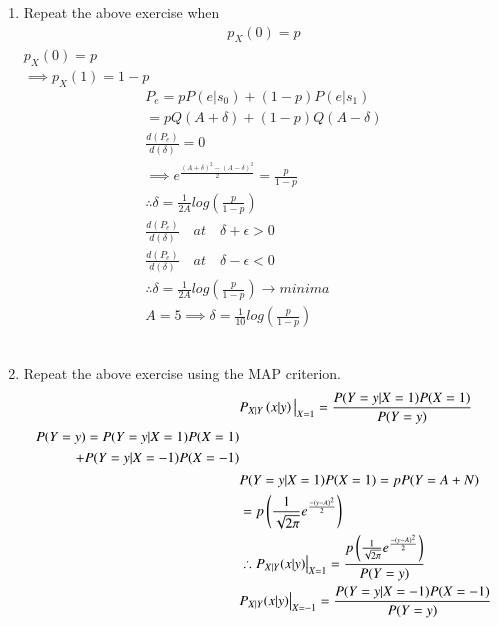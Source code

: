 \documentclass[journal,12pt,twocolumn]{IEEEtran}
\renewcommand\thesection{\arabic{section}}
\begin{document}
\begin{enumerate}[label=\thesection.\arabic*
,ref=\thesection.\theenumi]
\begin{align}
&e^{\frac{-(A-\delta)^{2}}{2}}-e^{\frac{-(A+\delta)^{2}}{2}}=0\\
&\therefore A-\delta=A+\delta, \implies \delta=0\\
&f"(\delta)=k((A-\delta)e^{\frac{-(A-\delta)^{2}}{2}}+(A+\delta)e^{\frac{-(A+\delta)^{2}}{2}})>0
\end{align}
\item Repeat the above exercise when 
	\begin{align}
		p_{X}(0) = p
	\end{align}
\solution
 $p_{X}(0)=p$ \\
 $\implies p_{X}(1)=1-p$
 \begin{align}
 P_{e}=p P(e|s_0)+(1-p)P(e|s_1)\\
 =p Q(A+\delta)+(1-p)Q(A-\delta)\\
 \frac{d(P_{e})}{d(\delta)}=0\\
 \implies e^\frac{(A+\delta)^{2}-(A-\delta)^{2}}{2}=\frac{p}{1-p}\\
 \therefore \delta=\frac{1}{2A}log(\frac{p}{1-p})\\
  \frac{d(P_{e})}{d(\delta)}\quad at \quad \delta+\epsilon>0 \\
  \nonumber
   \frac{d(P_{e})}{d(\delta)} \quad at\quad \delta-\epsilon<0 \\
   \nonumber
   \therefore \delta=\frac{1}{2A}log\left(\frac{p}{1-p}\right)\longrightarrow   minima\\
   A=5 \implies \delta=\frac{1}{10}log\left(\frac{p}{1-p}\right)
 \end{align}
 \\
\item Repeat the above exercise using the MAP criterion. \\
\solution
\begin{align}
&P_{X|Y}\brak{x|y} \big|_{X=1}= \frac{P(Y=y|X=1)P(X=1)}{P(Y=y)}\\
\begin{split}P(Y=y)=P(Y=y|X=1)P(X=1)\\+P(Y=y|X=-1)P(X=-1)\end{split}\\
&P(Y=y|X=1)P(X=1)=p P(Y=A+N)\\
&=p\brak{\frac{1}{\sqrt{2 \pi}} e^{\frac{-(y-A)^2}{2}}}\\
&\therefore P_{X|Y}(x|y) \big|_{X=1}=\frac{p\brak{\frac{1}{\sqrt{2 \pi}} e^{\frac{-(y-A)^2}{2}}}}{P(Y=y)}\\
&P_{X|Y}(x|y) \big|_{X=-1}= \frac{P(Y=y|X=-1)P(X=-1)}{P(Y=y)}\\

\end{align}
\end{enumerate}
\end{document}
